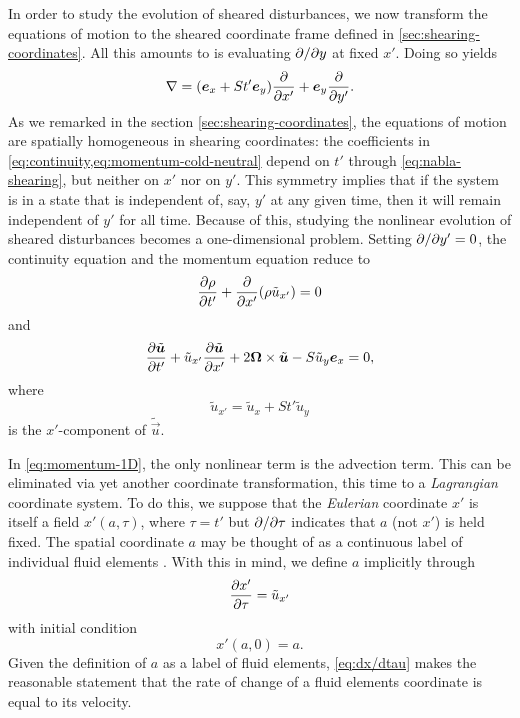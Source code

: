 \documentclass[aps,pre,notitlepage,amsmath,amssymb,amsfonts,nobibnotes,nofootinbib,superscriptaddress,onecolumn,a4paper,10pt]{revtex4-1}
\newcommand{\tvec}[1]{\tilde{\vec{#1}}}
\begin{document}
In order to study the evolution of sheared disturbances, we now transform the
equations of motion  to the
sheared coordinate frame defined in \cref{sec:shearing-coordinates}. All this
amounts to is evaluating $\partial{}/\partial{y}$ at fixed $x'$. Doing so yields
\begin{equation}
  \label{eq:nabla-shearing}
  \nabla = (\bm{e}_x + St'\bm{e}_y)\frac{\partial}{\partial x'} + \bm{e}_y\frac{\partial}{\partial y'}.
\end{equation}
As we remarked in the section \cref{sec:shearing-coordinates}, the equations
of motion are spatially homogeneous in shearing coordinates: the coefficients
in \cref{eq:continuity,eq:momentum-cold-neutral} depend on $t'$ through
\cref{eq:nabla-shearing}, but neither on $x'$ nor on $y'$. This symmetry
implies that if the system is in a state that is independent of, say, $y'$ at
any given time, then it will remain independent of $y'$ for all time. Because
of this, studying the nonlinear evolution of sheared disturbances becomes a
one-dimensional problem. Setting $\partial{}/\partial{y'}=0$, the continuity equation
 and the momentum equation
 reduce to
\begin{equation}
  \label{eq:continuity-1D}
  \frac{\partial\rho}{\partial t'} + \frac{\partial}{\partial x'}(\rho\tilde{u}_{x'}) = 0
\end{equation}
and
\begin{equation}
  \label{eq:momentum-1D}
  \pder{\tvec{u}}{t'} + \tilde{u}_{x'}\pder{\tvec{u}}{x'}
  + 2\vec{\Omega}\times\tvec{u} - S\tilde{u}_y\ex = 0,
\end{equation}
where
\begin{equation}
  \tilde{u}_{x'} = \tilde{u}_x + St'\tilde{u}_y
\end{equation}
is the $x'$-component of $\tvec{u}$.

In \cref{eq:momentum-1D}, the only nonlinear term is the advection term. This
can be eliminated via yet another coordinate transformation, this time to a
\emph{Lagrangian} coordinate system. To do this, we suppose that the
\emph{Eulerian} coordinate $x'$ is itself a field $x'(a,\tau)$, where
$\tau=t'$ but $\partial{}/\partial{\tau}$ indicates that $a$ (not $x'$) is held fixed.
The spatial coordinate $a$ may be thought of as a continuous label of
individual fluid elements \citep[see the beautiful review of Hamiltonian fluid
mechanics by][]{Salmon1988}. With this in mind, we define $a$ implicitly
through
\begin{equation}
  \label{eq:dx/dtau}
  \frac{\partial x'}{\partial\tau} = \tilde{u}_{x'}
\end{equation}
with initial condition
\begin{equation}
  \label{eq:initial-x}
  x'(a,0) = a.
\end{equation}
Given the definition of $a$ as a label of fluid elements, \cref{eq:dx/dtau}
makes the reasonable statement that the rate of change of a fluid elements
coordinate is equal to its velocity.
\end{document}

